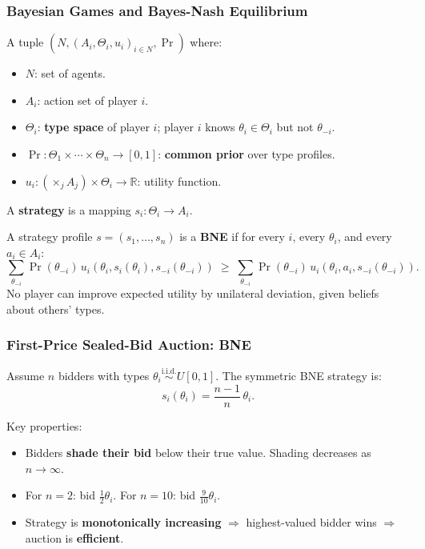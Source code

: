 \separator

\subsubsection{Bayesian Games and Bayes-Nash Equilibrium}

\begin{defbox}
A tuple $(N, (A_i, \Theta_i, u_i)_{i \in N}, \Pr)$ where:
\begin{itemize}
  \item $N$: set of agents.
  \item $A_i$: action set of player $i$.
  \item $\Theta_i$: \textbf{type space} of player $i$; player $i$ knows $\theta_i \in \Theta_i$ but not $\theta_{-i}$.
  \item $\Pr: \Theta_1 \times \cdots \times \Theta_n \to [0,1]$: \textbf{common prior} over type profiles.
  \item $u_i: (\times_{j} A_j) \times \Theta_i \to \mathbb{R}$: utility function.
\end{itemize}
A \textbf{strategy} is a mapping $s_i: \Theta_i \to A_i$.
\end{defbox}

\begin{defbox}
A strategy profile $s = (s_1, \ldots, s_n)$ is a \textbf{BNE} if for every $i$, every $\theta_i$, and every $a_i \in A_i$:
\[
  \sum_{\theta_{-i}} \Pr(\theta_{-i})\, u_i(\theta_i, s_i(\theta_i), s_{-i}(\theta_{-i})) \;\geq\; \sum_{\theta_{-i}} \Pr(\theta_{-i})\, u_i(\theta_i, a_i, s_{-i}(\theta_{-i})).
\]
No player can improve expected utility by unilateral deviation, given beliefs about others' types.
\end{defbox}

\separator

\subsubsection{First-Price Sealed-Bid Auction: BNE}

\begin{thmbox}
Assume $n$ bidders with types $\theta_i \overset{\text{i.i.d.}}{\sim} U[0,1]$. The symmetric BNE strategy is:
\[
  s_i(\theta_i) = \frac{n-1}{n}\,\theta_i.
\]
\end{thmbox}

Key properties:
\begin{itemize}
  \item Bidders \textbf{shade their bid} below their true value. Shading decreases as $n \to \infty$.
  \item For $n = 2$: bid $\frac{1}{2}\theta_i$. For $n = 10$: bid $\frac{9}{10}\theta_i$.
  \item Strategy is \textbf{monotonically increasing} $\Rightarrow$ highest-valued bidder wins $\Rightarrow$ auction is \textbf{efficient}.
\end{itemize}


